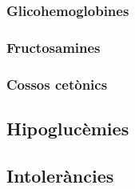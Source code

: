 \subsubsection{Glicohemoglobines}
\label{sec:glicohemoglobines}


\subsubsection{Fructosamines}
\label{sec:fructosamines}


\subsubsection{Cossos cetònics}
\label{sec:cossos-cetonics}


\subsection{Hipoglucèmies}
\label{sec:hipoglucemies}


\subsection{Intoleràncies}
\label{sec:intolerancies}

